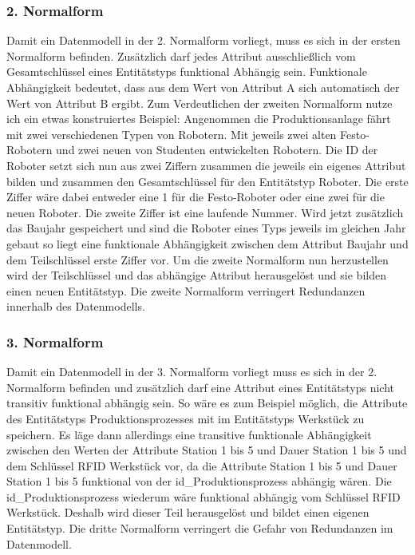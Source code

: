 \subsubsection*{2. Normalform}
Damit ein Datenmodell in der 2. Normalform vorliegt, muss es sich in der ersten Normalform befinden. Zusätzlich darf jedes Attribut ausschließlich vom Gesamtschlüssel eines Entitätstyps funktional Abhängig sein. Funktionale Abhängigkeit bedeutet, dass aus dem Wert von Attribut A sich automatisch der Wert von Attribut B ergibt. Zum Verdeutlichen der zweiten Normalform nutze ich ein etwas konstruiertes Beispiel: Angenommen die Produktionsanlage fährt mit zwei verschiedenen Typen von Robotern. Mit jeweils zwei alten Festo-Robotern und zwei neuen von Studenten entwickelten Robotern. Die ID der Roboter setzt sich nun aus zwei Ziffern zusammen die jeweils ein eigenes Attribut bilden und zusammen den Gesamtschlüssel für den Entitätstyp Roboter. Die erste Ziffer wäre dabei entweder eine 1 für die Festo-Roboter oder eine zwei für die neuen Roboter. Die zweite Ziffer ist eine laufende Nummer. Wird jetzt zusätzlich das Baujahr gespeichert und sind die Roboter eines Typs jeweils im gleichen Jahr gebaut so liegt eine funktionale Abhängigkeit zwischen dem Attribut Baujahr und dem Teilschlüssel erste Ziffer vor. Um die zweite Normalform nun herzustellen wird der Teilschlüssel und das abhängige Attribut herausgelöst und sie bilden einen neuen Entitätstyp. Die zweite Normalform verringert Redundanzen innerhalb des Datenmodells.\cite{Heuer:2001}

\subsubsection*{3. Normalform}
Damit ein Datenmodell in der 3. Normalform vorliegt muss es sich in der 2. Normalform befinden und zusätzlich darf eine Attribut eines Entitätstyps nicht transitiv funktional abhängig sein.  So wäre es zum Beispiel möglich, die Attribute des Entitätstyps Produktionsprozesses mit im Entitätstyps Werkstück zu speichern. Es läge dann allerdings eine transitive funktionale Abhängigkeit zwischen den Werten der Attribute Station 1 bis 5 und Dauer Station 1 bis 5 und dem Schlüssel RFID Werkstück vor, da die Attribute Station 1 bis 5 und Dauer Station 1 bis 5 funktional von der id\_Produktionsprozess abhängig wären. Die id\_Produktionsprozess wiederum wäre funktional abhängig vom Schlüssel RFID Werkstück. Deshalb wird dieser Teil herausgelöst und bildet einen eigenen Entitätstyp. Die dritte Normalform verringert die Gefahr von Redundanzen im Datenmodell.\cite{Heuer:2001}

